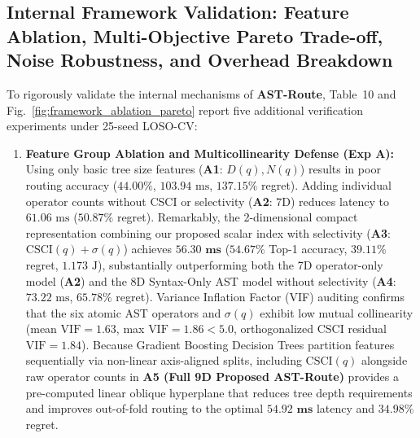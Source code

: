 \documentclass[10pt,a4paper]{article}
\begin{document}
\subsection{Internal Framework Validation: Feature Ablation, Multi-Objective Pareto Trade-off, Noise Robustness, and Overhead Breakdown}
To rigorously validate the internal mechanisms of \textbf{AST-Route}, Table~10 and Fig.~\ref{fig:framework_ablation_pareto} report five additional verification experiments under 25-seed LOSO-CV:
\begin{enumerate}[leftmargin=1.5em,itemsep=2pt]
    \item \textbf{Feature Group Ablation and Multicollinearity Defense (Exp A):} Using only basic tree size features (\textbf{A1}: $D(q), N(q)$) results in poor routing accuracy ($44.00\%$, $103.94\text{ ms}$, $137.15\%$ regret). Adding individual operator counts without CSCI or selectivity (\textbf{A2}: $7\text{D}$) reduces latency to $61.06\text{ ms}$ ($50.87\%$ regret). Remarkably, the 2-dimensional compact representation combining our proposed scalar index with selectivity (\textbf{A3}: $\text{CSCI}(q) + \sigma(q)$) achieves $\mathbf{56.30\text{ ms}}$ ($54.67\%$ Top-1 accuracy, $39.11\%$ regret, $1.173\text{ J}$), substantially outperforming both the 7D operator-only model (\textbf{A2}) and the 8D Syntax-Only AST model without selectivity (\textbf{A4}: $73.22\text{ ms}$, $65.78\%$ regret). Variance Inflation Factor (VIF) auditing confirms that the six atomic AST operators and $\sigma(q)$ exhibit low mutual collinearity (mean $\text{VIF} = 1.63$, max $\text{VIF} = 1.86 < 5.0$, orthogonalized $\text{CSCI}$ residual $\text{VIF} = 1.84$). Because Gradient Boosting Decision Trees partition features sequentially via non-linear axis-aligned splits, including $\text{CSCI}(q)$ alongside raw operator counts in \textbf{A5 (Full 9D Proposed AST-Route)} provides a pre-computed linear oblique hyperplane that reduces tree depth requirements and improves out-of-fold routing to the optimal $\mathbf{54.92\text{ ms}}$ latency and $\mathbf{34.98\%}$ regret.

\end{enumerate}
\end{document}
